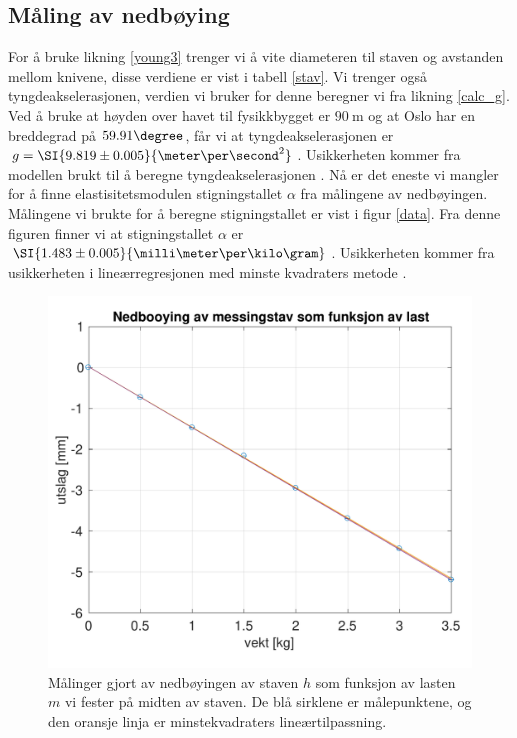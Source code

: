 \documentclass[%
 reprint,
nofootinbib,
aps,
]{revtex4-1}
\begin{document}
\subsection{Måling av nedbøying}
For å bruke likning \eqref{young3} trenger vi å vite diameteren til staven og avstanden mellom knivene, disse verdiene er vist i tabell \vref{stav}. Vi trenger også tyngdeakselerasjonen, verdien vi bruker for denne beregner vi fra likning \eqref{calc_g}. Ved å bruke at høyden over havet til fysikkbygget er $\SI{90}{\meter}$ og at Oslo har en breddegrad på $59.91\degree$, får vi at tyngdeakselerasjonen er $g=\SI{9.819\pm0.005}{\meter\per\second^2}$. Usikkerheten kommer fra modellen brukt til å beregne tyngdeakselerasjonen \cite{gravity}.
Nå er det eneste vi mangler for å finne elastisitetsmodulen stigningstallet $\alpha$ fra målingene av nedbøyingen. Målingene vi brukte for å beregne stigningstallet er vist i figur \vref{data}. Fra denne figuren finner vi at stigningstallet $\alpha$ er $\SI{1.483\pm0.005}{\milli\meter\per\kilo\gram}$. Usikkerheten kommer fra usikkerheten i lineærregresjonen med minste kvadraters metode \cite{squires}.
\begin{figure}[h!]
  \centering
  \includegraphics[scale=0.46]{nedboojing_c.pdf}
  \caption{Målinger gjort av nedbøyingen av staven $h$ som funksjon av lasten $m$ vi fester på midten av staven. De blå sirklene er målepunktene, og den oransje linja er minstekvadraters lineærtilpassning.}
  \label{data}
\end{figure}
\end{document}
